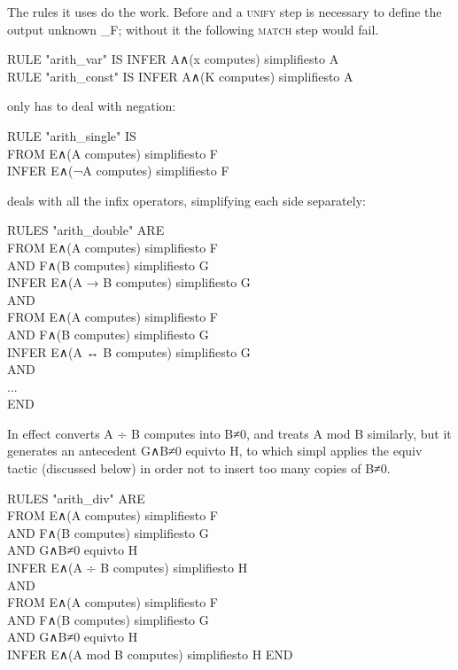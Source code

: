 The rules it uses do the work. Before  and  a \textsc{unify} step is necessary to define the output unknown \_F; without it the following \textsc{match} step would fail.
\begin{japeish}
RULE "arith\_var" IS INFER A∧(x computes) simplifiesto A \\
RULE "arith\_const" IS INFER A∧(K computes) simplifiesto A
\end{japeish}

 only has to deal with negation:
\begin{japeish}
RULE "arith\_single" IS \\
\tab FROM E∧(A computes) simplifiesto F \\
\tab INFER E∧(¬A computes) simplifiesto F
\end{japeish}

 deals with all the infix operators, simplifying each side separately:
\begin{japeish}
RULES "arith\_double" ARE \\
\tab FROM E∧(A computes) simplifiesto F \\
\tab AND F∧(B computes) simplifiesto G \\
\tab INFER E∧(A → B computes) simplifiesto G \\
AND \\
\tab FROM E∧(A computes) simplifiesto F \\
\tab AND F∧(B computes) simplifiesto G \\
\tab INFER E∧(A ↔ B computes) simplifiesto G \\
AND \\
... \\
END
\end{japeish}

In effect  converts A ÷ B computes into B≠0, and treats A mod B similarly, but it generates an antecedent G∧B≠0 equivto H, to which simpl applies the equiv tactic (discussed below) in order not to insert too many copies of B≠0.
\begin{japeish}
RULES "arith\_div" ARE \\
\tab FROM E∧(A computes) simplifiesto F \\
\tab AND F∧(B computes) simplifiesto G \\
\tab AND G∧B≠0 equivto H\\
\tab INFER E∧(A ÷ B computes) simplifiesto H \\
AND \\
\tab FROM E∧(A computes) simplifiesto F \\
\tab AND F∧(B computes) simplifiesto G \\
\tab AND G∧B≠0 equivto H\\
\tab INFER E∧(A mod B computes) simplifiesto H
END
\end{japeish}

